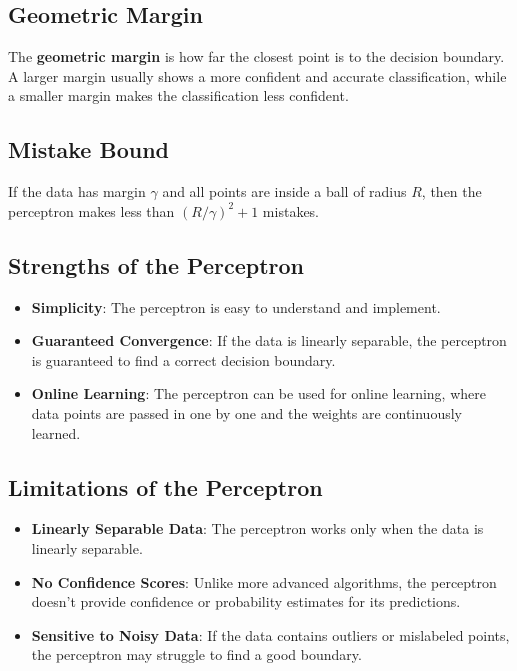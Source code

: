 \documentclass{article}
\begin{document}
\subsection*{Geometric Margin}

The \textbf{geometric margin} is how far the closest point is to the decision boundary. A larger margin usually shows a more confident and accurate classification, while a smaller margin makes the classification less confident.

\subsection*{Mistake Bound}

If the data has margin $\gamma$ and all points are inside a ball of radius $R$, then the perceptron makes less than ${(R/\gamma)}^2 + 1$ mistakes.

\subsection*{Strengths of the Perceptron}
\begin{itemize}
    \item \textbf{Simplicity}: The perceptron is easy to understand and implement.
    \item \textbf{Guaranteed Convergence}: If the data is linearly separable, the perceptron is guaranteed to find a correct decision boundary.
    \item \textbf{Online Learning}: The perceptron can be used for online learning, where data points are passed in one by one and the weights are continuously learned.
\end{itemize}

\subsection*{Limitations of the Perceptron}
\begin{itemize}
    \item \textbf{Linearly Separable Data}: The perceptron works only when the data is linearly separable.
    \item \textbf{No Confidence Scores}: Unlike more advanced algorithms, the perceptron doesn't provide confidence or probability estimates for its predictions.
    \item \textbf{Sensitive to Noisy Data}: If the data contains outliers or mislabeled points, the perceptron may struggle to find a good boundary.
\end{itemize}
\end{document}
